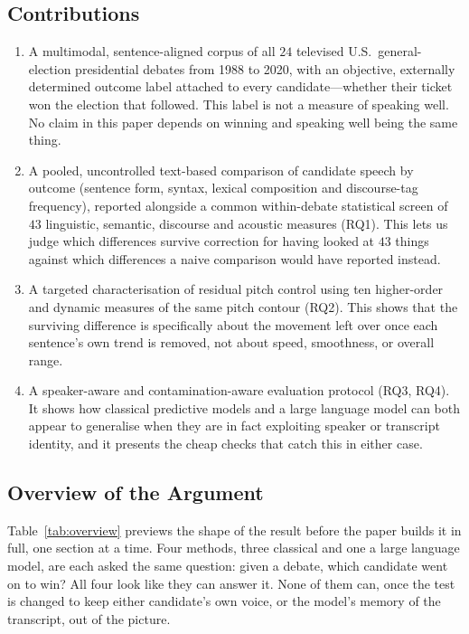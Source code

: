 \documentclass[pdflatex,sn-mathphys-num]{sn-jnl}%
\begin{document}
\subsection{Contributions}
\label{sec:intro:contrib}

\begin{enumerate}\itemsep3pt
  \item A multimodal, sentence-aligned corpus of all $24$ televised U.S.\
        general-election presidential debates from 1988 to 2020, with an
        objective, externally determined outcome label attached to every
        candidate---whether their ticket won the election that followed. This
        label is not a measure of speaking well. No claim in this paper
        depends on winning and speaking well being the same thing.
  \item A pooled, uncontrolled text-based comparison of candidate speech by
        outcome (sentence form, syntax, lexical composition and discourse-tag
        frequency), reported alongside a common within-debate statistical
        screen of $43$ linguistic, semantic, discourse and acoustic measures
        (RQ1). This lets us judge which differences survive correction for
        having looked at $43$ things against which differences a
        naive comparison would have reported instead.
  \item A targeted characterisation of residual pitch control using ten
        higher-order and dynamic measures of the same pitch contour (RQ2).
        This shows that the surviving difference is specifically about the
        movement left over once each sentence's own trend is removed, not
        about speed, smoothness, or overall range.
  \item A speaker-aware and contamination-aware evaluation protocol (RQ3,
        RQ4). It shows how classical predictive models and a large language
        model can both appear to generalise when they are in fact exploiting
        speaker or transcript identity, and it presents the cheap checks
        that catch this in either case.
\end{enumerate}

\subsection{Overview of the Argument}
\label{sec:intro:overview}

Table~\ref{tab:overview} previews the shape of the result before the paper
builds it in full, one section at a time. Four methods, three classical and
one a large language model, are each asked the same question: given a
debate, which candidate went on to win? All four look like they can answer
it. None of them can, once the test is changed to keep either candidate's
own voice, or the model's memory of the transcript, out of the picture.
\end{document}
